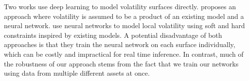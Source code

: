 \documentclass[12pt]{article}
\begin{document}
Two works use deep learning to model volatility surfaces directly. \citet{ackerer} proposes an approach where volatility is assumed to be a product of an existing model and a neural network. \citet{deep_local_vol} use neural networks to model local volatility using soft and hard constraints inspired by existing models. A potential disadvantage of both approaches is that they train the neural network on each surface individually, which can be costly and impractical for real time inference.  In contrast, much of the robustness of our approach stems from the fact that we train our networks using data from multiple different assets at once.




\end{document}
